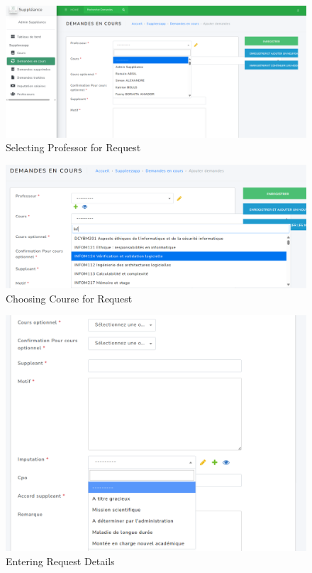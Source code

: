 \documentclass[12pt]{article}
\begin{document}
\begin{figure}[H]
    \centering
    \includegraphics[width=0.75\linewidth]{image45.png}
    \caption{Selecting Professor for Request}
\end{figure}

\begin{figure}[H]
    \centering
    \includegraphics[width=0.75\linewidth]{image50.png}
    \caption{Choosing Course for Request}
\end{figure}

\begin{figure}[H]
    \centering
    \includegraphics[width=0.75\linewidth]{image51.png}
    \caption{Entering Request Details}
\end{figure}
\end{document}
